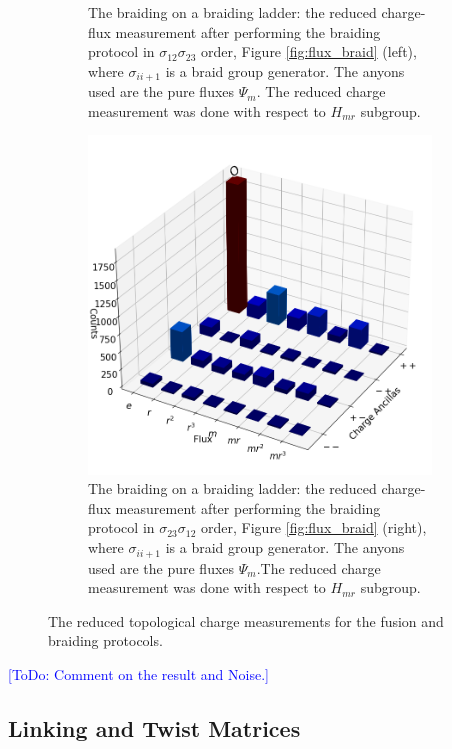 \documentclass[two column]{article}
\newcommand{\jovan}[1]{\textcolor{blue}{[#1]}}
\begin{document}
\begin{figure}
\begin{subfigure}{0.47\textwidth}
    \caption{The braiding on a braiding ladder: the reduced charge-flux measurement after performing the braiding protocol in $\sigma_{12}\sigma_{23}$ order, Figure \ref{fig:flux_braid} (left), where $\sigma_{ii+1}$ is a braid group generator. The anyons used are the pure fluxes $\Psi_m$. The reduced charge measurement was done with respect to $H_{mr}$ subgroup.} 
    \label{fig:braid_fuse}
\end{subfigure}\hfill
\begin{subfigure}{0.47\textwidth}
    \includegraphics[width=\linewidth]{Figures/braid_link.png}
    \caption{The braiding on a braiding ladder: the reduced charge-flux measurement after performing the braiding protocol in $\sigma_{23}\sigma_{12}$ order, Figure \ref{fig:flux_braid} (right), where $\sigma_{ii+1}$ is a braid group generator. The anyons used are the pure fluxes $\Psi_m$.The reduced charge measurement was done with respect to $H_{mr}$ subgroup.}
    \label{fig:braid_link}
\end{subfigure}
\caption{The reduced topological charge measurements for the fusion and braiding protocols.}
\label{fig:red_charge_res}
\end{figure}
\jovan{ToDo: Comment on the result and Noise.}


\subsection{Linking and Twist Matrices}
\end{document}
